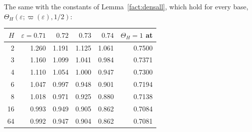 \documentclass[11pt]{amsart}
\theoremstyle{definition}
\theoremstyle{remark}
\newcommand{\eps}{\varepsilon}
\begin{document}
\noindent The same with the constants of Lemma~\ref{fact:densall}, which hold for every base,
$\Theta_H(\eps;\varpi(\eps),1/2)$:

\begin{center}
\begin{tabular}{rrrrrr}
\toprule
$H$ & $\eps=0.71$ & $0.72$ & $0.73$ & $0.74$ & $\Theta_H=1$ at\\
\midrule
2 & 1.260 & 1.191 & 1.125 & 1.061 & 0.7500\\
3 & 1.160 & 1.099 & 1.041 & 0.984 & 0.7371\\
4 & 1.110 & 1.054 & 1.000 & 0.947 & 0.7300\\
6 & 1.047 & 0.997 & 0.948 & 0.901 & 0.7194\\
8 & 1.018 & 0.971 & 0.925 & 0.880 & 0.7138\\
16 & 0.993 & 0.949 & 0.905 & 0.862 & 0.7084\\
64 & 0.992 & 0.947 & 0.904 & 0.862 & 0.7081\\
\bottomrule
\end{tabular}
\end{center}
\end{document}
